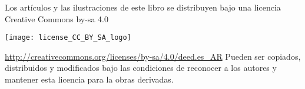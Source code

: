 \begin{center}
Los artículos y las ilustraciones de este libro se 
distribuyen bajo una licencia Creative Commons by-sa 4.0 
\newline

\texttt{[image: license\_CC\_BY\_SA\_logo]}

\url{http://creativecommons.org/licenses/by-sa/4.0/deed.es_AR}
\newline
Pueden ser copiados, distribuidos y modificados bajo las condiciones 
de reconocer a los autores y mantener esta licencia para la obras derivadas.
\end{center}
